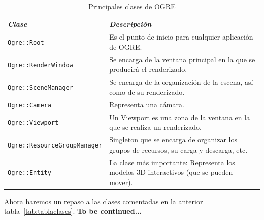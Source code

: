 \documentclass[a4paper]{scrartcl}
\begin{document}
\begin{table}[h!]
  \centering
  \begin{tabular}{|l||p{10cm}|}
  \hline
	\textit{Clase} & \textit{Descripción}\\
	\hline
	\texttt{Ogre::Root} & Es el punto de inicio para cualquier aplicación de OGRE.\\
	\hline
	\texttt{Ogre::RenderWindow} & Se encarga de la ventana principal en la que se producirá el renderizado.\\
	\hline
	\texttt{Ogre::SceneManager} & Se encarga de la organización de la escena, así como de su renderizado.\\
	\hline
	\texttt{Ogre::Camera} & Representa una cámara.\\
	\hline
	\texttt{Ogre::Viewport} & Un Viewport es una zona de la ventana en la que se realiza un renderizado.\\
  \hline
	\texttt{Ogre::ResourceGroupManager} & Singleton que se encarga de organizar los grupos de recursos, su carga y descarga, etc.\\
	\hline
	\texttt{Ogre::Entity} & La clase más importante: Representa los modelos 3D interactivos (que se pueden mover).\\
	\hline
  \end{tabular}
  \caption{Principales clases de OGRE}
  \label{tab:tablaclases}
\end{table}

Ahora haremos un repaso a las clases comentadas en la anterior tabla~\vref{tab:tablaclases}. \textbf{To be continued...}



\end{document}
